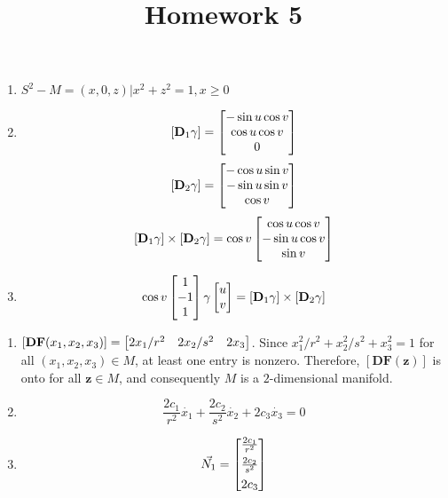 \documentclass{homework}
\title{Homework 5}
\begin{document}
\maketitle

\begin{problem}{1}
\begin{enumerate}
\item $S^2 - M = {(x, 0, z) | x^2 + z^2 = 1, x \geq 0}$

\item
$$[\mathbf{D}_1\gamma] = \begin{bmatrix}-\sin u \cos v\\
                                \cos u \cos v\\
                                0\end{bmatrix}$$
$$[\mathbf{D}_2\gamma] = \begin{bmatrix}-\cos u \sin v\\
                               -\sin u \sin v\\
                                \cos v\end{bmatrix}$$
$$[\mathbf{D}_1\gamma] \times [\mathbf{D}_2\gamma] =
\cos v \begin{bmatrix} \cos u \cos v\\
             -\sin u \cos v\\
              \sin v\end{bmatrix}$$

\item
$$\cos v\begin{bmatrix}1\\-1\\1\end{bmatrix} \gamma\begin{bmatrix}u\\v\end{bmatrix}
= [\mathbf{D}_1\gamma] \times [\mathbf{D}_2\gamma]$$
\end{enumerate}
\end{problem}

\begin{problem}{2}
\begin{enumerate}
\item $[\mathbf{DF}(x_1, x_2, x_3)] = \begin{bmatrix}2x_1/r^2 & 2x_2/s^2 & 2x_3\end{bmatrix}$. Since
$x_1^2/r^2 + x_2^2/s^2 + x_3^2 = 1$ for all $(x_1, x_2, x_3) \in M$, at least
one entry is nonzero. Therefore, $[\mathbf{DF}(\mathbf{z})]$ is onto for all
$\mathbf{z} \in M$, and consequently $M$ is a $2$-dimensional manifold. \QED

\item $$\frac{2c_1}{r^2}\dot{x_1} +
        \frac{2c_2}{s^2}\dot{x_2} +
                    2c_3\dot{x_3} = 0$$

\item $$\vec{N_1} = \begin{bmatrix}\frac{2c_1}{r^2}\\[4pt]
                          \frac{2c_2}{s^2}\\[4pt]
                          2c_3\end{bmatrix}$$
\end{enumerate}
\end{problem}
\end{document}
